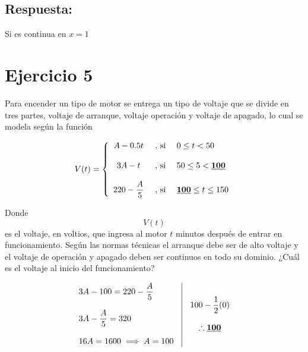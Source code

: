 \documentclass[12pt]{article}
\begin{document}
\subsection*{Respuesta:} \noindent Si es continua en $x=1$




\section*{Ejercicio 5}
\noindent Para encender un tipo de motor se entrega un tipo de voltaje que se divide en tres partes, 
voltaje de arranque, voltaje operación y voltaje de apagado, lo cual se modela según la función

\[
V(t) = 
\left\{
  \begin{array}{c l l}
    A - 0.5t & \text{ , si } & 0 \leq t < 50 \\\\
    3A - t & \text{ , si } & 50 \leq 5 < \textbf{\underline{100}} \\\\
    220 - \dfrac{A}{5} & \text{ , si } & \textbf{\underline{100}} \leq t \leq 150
  \end{array}
\right.
\]

\noindent Donde $$V(t)$$ es el voltaje, en voltios, que ingresa al motor $t$ minutos después de entrar en
funcionamiento. Según las normas técnicas el arranque debe ser de alto voltaje y el voltaje de operación 
y apagado deben ser continuos en todo su dominio. ¿Cuál es el voltaje al inicio del funcionamiento?

\[
\begin{array}{l|c}
  \begin{array}{l}
    3A - 100 = 220 - \dfrac{A}{5} \\\\
    3A - \dfrac{A}{5} = 320 \\\\
    16A = 1600 \implies A = 100
  \end{array}
  &
  \begin{array}{c}
    100 - \dfrac{1}{2}(0) \\\\
    \therefore \textbf{\underline{100}}
  \end{array}
\end{array}
\]
\end{document}
